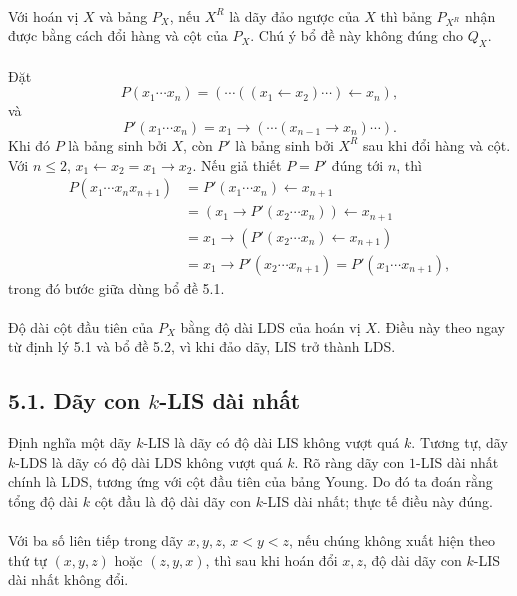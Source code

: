\documentclass[11pt]{article}
\begin{document}
\paragraph{}
Với hoán vị \(X\) và bảng \(P_X\), nếu \(X^R\) là dãy đảo ngược của \(X\) thì
bảng \(P_{X^R}\) nhận được bằng cách đổi hàng và cột của \(P_X\). Chú ý bổ đề
này không đúng cho \(Q_X\).

\paragraph{}
Đặt
\[
P(x_1\cdots x_n)=(\cdots((x_1\leftarrow x_2)\cdots)\leftarrow x_n),
\]
và
\[
P'(x_1\cdots x_n)=x_1\to(\cdots(x_{n-1}\to x_n)\cdots).
\]
Khi đó \(P\) là bảng sinh bởi \(X\), còn \(P'\) là bảng sinh bởi \(X^R\) sau
khi đổi hàng và cột. Với \(n\le2\), \(x_1\leftarrow x_2=x_1\to x_2\). Nếu giả
thiết \(P=P'\) đúng tới \(n\), thì
\[
\begin{aligned}
P(x_1\cdots x_nx_{n+1})
&=P'(x_1\cdots x_n)\leftarrow x_{n+1}\\
&=(x_1\to P'(x_2\cdots x_n))\leftarrow x_{n+1}\\
&=x_1\to(P'(x_2\cdots x_n)\leftarrow x_{n+1})\\
&=x_1\to P'(x_2\cdots x_{n+1})
=P'(x_1\cdots x_{n+1}),
\end{aligned}
\]
trong đó bước giữa dùng bổ đề 5.1.

\paragraph{}
Độ dài cột đầu tiên của \(P_X\) bằng độ dài LDS của hoán vị \(X\). Điều này
theo ngay từ định lý 5.1 và bổ đề 5.2, vì khi đảo dãy, LIS trở thành LDS.

\subsection*{5.1. Dãy con \(k\)-LIS dài nhất}

Định nghĩa một dãy \(k\)-LIS là dãy có độ dài LIS không vượt quá \(k\). Tương
tự, dãy \(k\)-LDS là dãy có độ dài LDS không vượt quá \(k\). Rõ ràng dãy con
\(1\)-LIS dài nhất chính là LDS, tương ứng với cột đầu tiên của bảng Young.
Do đó ta đoán rằng tổng độ dài \(k\) cột đầu là độ dài dãy con \(k\)-LIS dài
nhất; thực tế điều này đúng.

\paragraph{}
Với ba số liên tiếp trong dãy \(x,y,z\), \(x<y<z\), nếu chúng không xuất hiện
theo thứ tự \((x,y,z)\) hoặc \((z,y,x)\), thì sau khi hoán đổi \(x,z\), độ dài
dãy con \(k\)-LIS dài nhất không đổi.
\end{document}
